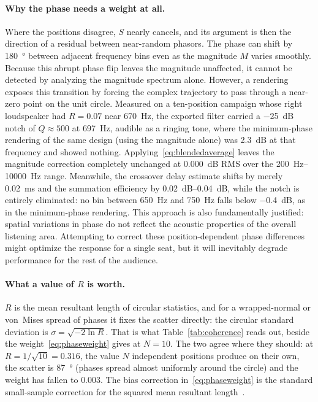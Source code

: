 \paragraph{Why the phase needs a weight at all.} Where the positions disagree, $S$ nearly cancels, and its argument is then the direction of a residual between near-random phasors. The phase can shift by \SI{180}{\degree} between adjacent frequency bins even as the magnitude $M$ varies smoothly. Because this abrupt phase flip leaves the magnitude unaffected, it cannot be detected by analyzing the magnitude spectrum alone. However, a  rendering exposes this transition by forcing the complex trajectory to pass through a near-zero point on the unit circle. Measured on a ten-position campaign whose right loudspeaker had $R=0.07$ near \SI{670}{\hertz}, the exported filter carried a \SI{-25}{\dB} notch of $Q\approx500$ at \SI{697}{\hertz}, audible as a ringing tone, where the minimum-phase rendering of the same design (using the magnitude alone) was \SI{+2.3}{\dB} at that frequency and showed nothing. Applying~\eqref{eq:blendedaverage} leaves the magnitude correction completely unchanged at \SI{0.000}{\dB} RMS over the \SIrange{200}{10000}{\hertz} range. Meanwhile, the crossover delay estimate shifts by merely \SI{0.02}{\milli\second} and the summation efficiency by \SIrange{0.02}{0.04}{\dB}, while the notch is entirely eliminated: no bin between \SI{650}{\hertz} and \SI{750}{\hertz} falls below \SI{-0.4}{\dB}, as in the minimum-phase rendering. This approach is also fundamentally justified: spatial variations in phase do not reflect the acoustic properties of the overall listening area. Attempting to correct these position-dependent phase differences might optimize the response for a single seat, but it will inevitably degrade performance for the rest of the audience.

\paragraph{What a value of $R$ is worth.} $R$ is the mean resultant length of circular statistics, and for a wrapped-normal or von~Mises spread of phases it fixes the scatter directly: the circular standard deviation is $\sigma=\sqrt{-2\ln R}$. That is what Table~\ref{tab:coherence} reads out, beside the weight~\eqref{eq:phaseweight} gives at $N=10$. The two agree where they should: at $R=1/\sqrt{10}=0.316$, the value $N$ independent positions produce on their own, the scatter is \SI{87}{\degree} (phases spread almost uniformly around the circle) and the weight has fallen to $0.003$. The bias correction in~\eqref{eq:phaseweight} is the standard small-sample correction for the squared mean resultant length~\cite{Kutil2012}.

